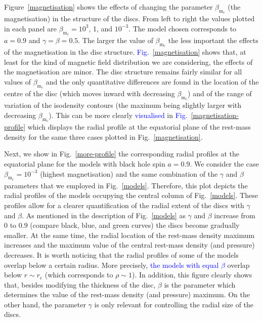 \documentclass{aa}
\newcommand{\sg}[1]{\textcolor{blue}{#1}}
\begin{document}
Figure~\ref{magnetisation} shows the effects of changing the parameter $\beta_{\mathrm{m}_{\mathrm{c}}}$ (the magnetisation) in the structure of the discs. From left to right the values plotted in each panel are $\beta_{\mathrm{m}_{\mathrm{c}}}=10^3$, 1, and $10^{-3}$. The model chosen corresponds to $a=0.9$ and $\gamma=\beta=0.5$. The larger the value of $\beta_{\mathrm{m}_{\mathrm{c}}}$ the less important the effects of the magnetisation in the disc structure. \sg{Fig.}~\ref{magnetisation} shows that, at least for the kind of magnetic field distribution we are considering, the effects of the magnetisation are minor. The disc structure remains fairly similar for all values of $\beta_{\mathrm{m}_{\mathrm{c}}}
$ and the only quantitative differences are found in the location of the centre of the disc (which moves inward with decreasing $\beta_{\mathrm{m}_{\mathrm{c}}}$) and of the range of variation of the isodensity contours (the maximum being slightly larger with decreasing $\beta_{\mathrm{m}_{\mathrm{c}}}$). This can be more clearly \sg{visualised} in \sg{Fig.}~\ref{magnetisation-profile} which displays the radial profile at the equatorial plane of the rest-mass density for the same three cases plotted in Fig.~\ref{magnetisation}.

Next, we show in Fig.~\ref{more-profile} the corresponding radial profiles at the equatorial plane for the models with black hole spin $a=0.9$. We consider the case $\beta_{\mathrm{m}_{\mathrm{c}}}=10^{-3}$ (highest magnetisation) and the same combination of the $\gamma$ and $\beta$ parameters that we employed in Fig.~\ref{models}. Therefore, this plot depicts the radial profiles of the models occupying the central column of Fig.~\ref{models}. These profiles allow for a clearer quantification of the radial extent of the discs with $\gamma$ and $\beta$. As mentioned in the description of Fig.~\ref{models} as $\gamma$ and $\beta$ increase from 0 to 0.9 (compare black, blue, and green curves) the discs become gradually smaller. At the same time, the radial location of the rest-mass density maximum increases and the maximum value of the central rest-mass density (and pressure) decreases. It is worth noticing that the radial profiles of some of the models overlap below a certain radius. More precisely, \sg{the models with equal $\beta$} overlap below $r\sim r_{\mathrm{c}}$ (which corresponds to $\rho \sim 1$). In addition, this figure clearly shows that, besides modifying the thickness of the disc, $\beta$ is the parameter which determines the value of the rest-mass density (and pressure) maximum. On the other hand, the parameter $\gamma$ is only relevant for controlling the radial size of the discs.
\end{document}
